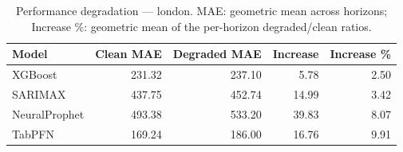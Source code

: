 \begin{table}[h]
\centering
\caption{Performance degradation — london. MAE: geometric mean across horizons; Increase \%: geometric mean of the per-horizon degraded/clean ratios.}
\label{tab:degradation_summary_london}
\begin{tabular}{lrrrr}
\toprule
Model & Clean MAE & Degraded MAE & Increase & Increase \% \\
\midrule
XGBoost & 231.32 & 237.10 & 5.78 & 2.50 \\
SARIMAX & 437.75 & 452.74 & 14.99 & 3.42 \\
NeuralProphet & 493.38 & 533.20 & 39.83 & 8.07 \\
TabPFN & 169.24 & 186.00 & 16.76 & 9.91 \\
\bottomrule
\end{tabular}
\end{table}
